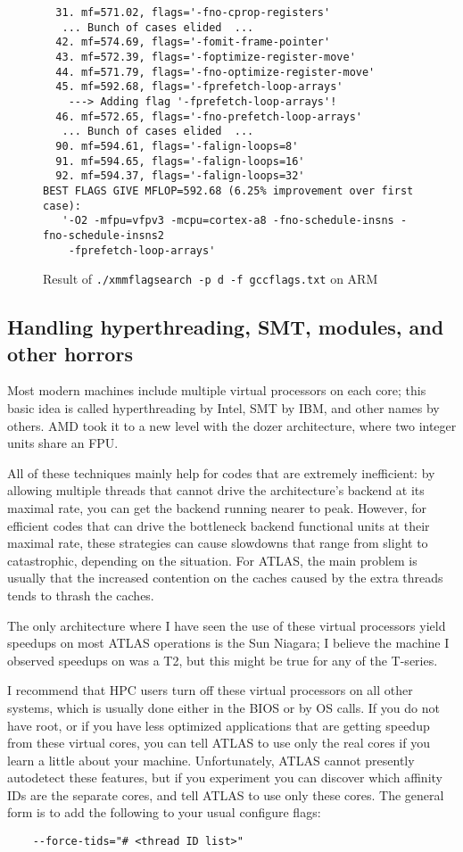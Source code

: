 \documentclass[11pt]{article}
\begin{document}
\begin{figure}[p]
\begin{footnotesize}
\begin{verbatim}
  31. mf=571.02, flags='-fno-cprop-registers'
   ... Bunch of cases elided  ...
  42. mf=574.69, flags='-fomit-frame-pointer'
  43. mf=572.39, flags='-foptimize-register-move'
  44. mf=571.79, flags='-fno-optimize-register-move'
  45. mf=592.68, flags='-fprefetch-loop-arrays'
    ---> Adding flag '-fprefetch-loop-arrays'!
  46. mf=572.65, flags='-fno-prefetch-loop-arrays'
   ... Bunch of cases elided  ...
  90. mf=594.61, flags='-falign-loops=8'
  91. mf=594.65, flags='-falign-loops=16'
  92. mf=594.37, flags='-falign-loops=32'
BEST FLAGS GIVE MFLOP=592.68 (6.25% improvement over first case):
   '-O2 -mfpu=vfpv3 -mcpu=cortex-a8 -fno-schedule-insns -fno-schedule-insns2 
    -fprefetch-loop-arrays'
\end{verbatim}
\end{footnotesize}
\caption{Result of {\tt ./xmmflagsearch -p d -f gccflags.txt} on ARM}
\label{fig-flagsrch}
\end{figure}

\clearpage
\subsection{Handling hyperthreading, SMT, modules, and other horrors}
\label{sec-tids}
Most modern machines include multiple virtual processors on each core;
this basic idea is called hyperthreading by Intel, SMT by IBM, and other
names by others.  AMD took it to a new level with the dozer architecture,
where two integer units share an FPU.

All of these techniques mainly help for codes that are extremely inefficient:
by allowing multiple threads that cannot drive the architecture's backend at 
its maximal rate, you can get the backend running nearer to peak.  However,
for efficient codes that can drive the bottleneck backend functional units
at their maximal rate, these strategies can cause slowdowns that range
from slight to catastrophic, depending on the situation.  For ATLAS,
the main problem is usually that the increased contention on the caches 
caused by the extra threads tends to thrash the caches.

The only architecture where I have seen the use of these virtual processors
yield speedups on most ATLAS operations is the Sun Niagara;  I believe the
machine I observed speedups on was a T2, but this might be true for any
of the T-series.

I recommend that HPC users turn off these virtual processors on all other
systems, which is usually done either in the BIOS or by OS calls.  If
you do not have root, or if you have less optimized applications that are
getting speedup from these virtual cores, you can tell ATLAS to use only
the real cores if you learn a little about your machine.  Unfortunately,
ATLAS cannot presently autodetect these features, but if you experiment
you can discover which affinity IDs are the separate cores, and tell
ATLAS to use only these cores.  The general form is to add the following
to your usual configure flags:
\begin{verbatim}
    --force-tids="# <thread ID list>"
\end{verbatim}
\end{document}

